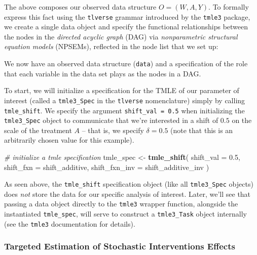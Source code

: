 \documentclass[12pt, krantz2,]{krantz}
\newenvironment{Shaded}{\begin{snugshade}}{\end{snugshade}}
\newcommand{\CommentTok}[1]{\textcolor[rgb]{0.37,0.37,0.37}{\textit{#1}}}
\newcommand{\DataTypeTok}[1]{\textcolor[rgb]{0.27,0.27,0.27}{#1}}
\newcommand{\FloatTok}[1]{\textcolor[rgb]{0.06,0.06,0.06}{#1}}
\newcommand{\KeywordTok}[1]{\textcolor[rgb]{0.27,0.27,0.27}{\textbf{#1}}}
\newcommand{\NormalTok}[1]{#1}
\newcommand{\StringTok}[1]{\textcolor[rgb]{0.5,0.5,0.5}{#1}}
\theoremstyle{definition}
\theoremstyle{definition}
\theoremstyle{definition}
\newcommand{\1}{\mathbbm{1}}
\begin{document}
The above composes our observed data structure \(O = (W, A, Y)\). To formally
express this fact using the \texttt{tlverse} grammar introduced by the \texttt{tmle3} package,
we create a single data object and specify the functional relationships between
the nodes in the \emph{directed acyclic graph} (DAG) via \emph{nonparametric structural
equation models} (NPSEMs), reflected in the node list that we set up:

We now have an observed data structure (\texttt{data}) and a specification of the role
that each variable in the data set plays as the nodes in a DAG.

To start, we will initialize a specification for the TMLE of our parameter of
interest (called a \texttt{tmle3\_Spec} in the \texttt{tlverse} nomenclature) simply by calling
\texttt{tmle\_shift}. We specify the argument \texttt{shift\_val\ =\ 0.5} when initializing the
\texttt{tmle3\_Spec} object to communicate that we're interested in a shift of \(0.5\) on
the scale of the treatment \(A\) -- that is, we specify \(\delta = 0.5\) (note that
this is an arbitrarily chosen value for this example).

\begin{Shaded}
\begin{Highlighting}[]
\CommentTok{# initialize a tmle specification}
\NormalTok{tmle_spec <-}\StringTok{ }\KeywordTok{tmle_shift}\NormalTok{(}
  \DataTypeTok{shift_val =} \FloatTok{0.5}\NormalTok{,}
  \DataTypeTok{shift_fxn =}\NormalTok{ shift_additive,}
  \DataTypeTok{shift_fxn_inv =}\NormalTok{ shift_additive_inv}
\NormalTok{)}
\end{Highlighting}
\end{Shaded}

As seen above, the \texttt{tmle\_shift} specification object (like all \texttt{tmle3\_Spec}
objects) does \emph{not} store the data for our specific analysis of interest. Later,
we'll see that passing a data object directly to the \texttt{tmle3} wrapper function,
alongside the instantiated \texttt{tmle\_spec}, will serve to construct a \texttt{tmle3\_Task}
object internally (see the \texttt{tmle3} documentation for details).

\hypertarget{targeted-estimation-of-stochastic-interventions-effects}{%
\subsubsection{Targeted Estimation of Stochastic Interventions Effects}\label{targeted-estimation-of-stochastic-interventions-effects}}
\end{document}
